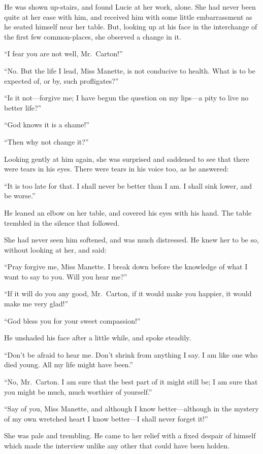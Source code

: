 He was shown up-stairs, and found Lucie at her work, alone.  She had
never been quite at her ease with him, and received him with some
little  embarrassment as he seated himself near her table.  But,
looking up at his face in the interchange of the first few
common-places, she observed a change in it.

``I fear you are not well, Mr.\ Carton!''

``No.  But the life I lead, Miss Manette, is not conducive to health.
What is to be expected of, or by, such profligates?''

``Is it not---forgive me; I have begun the question on my lips---a pity
to live no better life?''

``God knows it is a shame!''

``Then why not change it?''

Looking gently at him again, she was surprised and saddened to see
that there were tears in his eyes.  There were tears in his voice too,
as he answered:

``It is too late for that.  I shall never be better than I am.
I shall sink lower, and be worse.''

He leaned an elbow on her table, and covered his eyes with his hand.
The table trembled in the silence that followed.

She had never seen him softened, and was much distressed.  He knew
her to be so, without looking at her, and said:

``Pray forgive me, Miss Manette.  I break down before the knowledge
of what I want to say to you.  Will you hear me?''

``If it will do you any good, Mr.\ Carton, if it would make you happier,
it would make me very glad!''

``God bless you for your sweet compassion!''

He unshaded his face after a little while, and spoke steadily.

``Don't be afraid to hear me.  Don't shrink from anything I say.
I am like one who died young.  All my life might have been.''

``No, Mr.\ Carton.  I am sure that the best part of it might still be;
I am sure that you might be much, much worthier of yourself.''

``Say of you, Miss Manette, and although I know better---although
in the mystery of my own wretched heart I know better---I shall
never forget it!''

She was pale and trembling.  He came to her relief with a fixed
despair of himself which made the interview unlike any other
that could have been holden.

